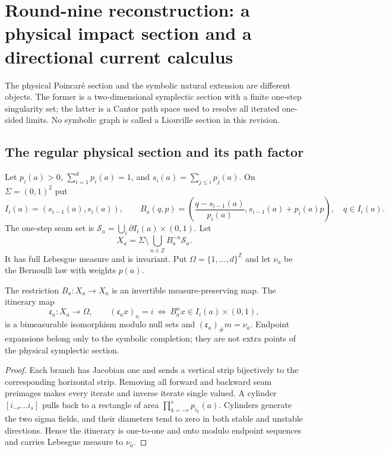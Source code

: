 \section{Round-nine reconstruction: a physical impact section and a directional current calculus}
\label{sec:r9-a1}

The physical Poincar\'e section and the symbolic natural extension are different
objects.  The former is a two-dimensional symplectic section with a finite
one-step singularity set; the latter is a Cantor path space used to resolve all
iterated one-sided limits.  No symbolic graph is called a Liouville section in
this revision.

\subsection{The regular physical section and its path factor}

Let $p_i(a)>0$, $\sum_{i=1}^d p_i(a)=1$, and
$s_i(a)=\sum_{j\le i}p_j(a)$.  On
$\Sigma=(0,1)^2$ put
\[
 I_i(a)=(s_{i-1}(a),s_i(a)),
 \qquad
 B_a(q,p)=\left(
 \frac{q-s_{i-1}(a)}{p_i(a)},
 s_{i-1}(a)+p_i(a)p
 \right),\quad q\in I_i(a).
\]
The one-step seam set is $\mathscr S_a=\bigcup_i\partial I_i(a)\times(0,1)$.
Let
\[
 X_a=\Sigma\setminus\bigcup_{n\in\mathbb Z}B_a^{-n}\mathscr S_a.
\]
It has full Lebesgue measure and is invariant.  Put
$\Omega=\{1,\ldots,d\}^{\mathbb Z}$ and let $\nu_a$ be the Bernoulli law with
weights $p(a)$.

\begin{theorem}
\label{thm:r9-a1-factor}
The restriction $B_a:X_a\to X_a$ is an invertible measure-preserving map.
The itinerary map
\[
 \mathfrak c_a:X_a\longrightarrow\Omega,
 \qquad
 (\mathfrak c_a x)_n=i\ \Longleftrightarrow\ B_a^nx\in I_i(a)\times(0,1),
\]
is a bimeasurable isomorphism modulo null sets and
$(\mathfrak c_a)_\#m=\nu_a$.  Endpoint expansions belong only to the symbolic
completion; they are not extra points of the physical symplectic section.
\end{theorem}

\begin{proof}
Each branch has Jacobian one and sends a vertical strip bijectively to the
corresponding horizontal strip.  Removing all forward and backward seam
preimages makes every iterate and inverse iterate single valued.  A cylinder
$[i_{-r}\ldots i_s]$ pulls back to a rectangle of area
$\prod_{k=-r}^sp_{i_k}(a)$.  Cylinders generate the two sigma fields, and their
diameters tend to zero in both stable and unstable directions.  Hence the
itinerary is one-to-one and onto modulo endpoint sequences and carries
Lebesgue measure to $\nu_a$.
\end{proof}

